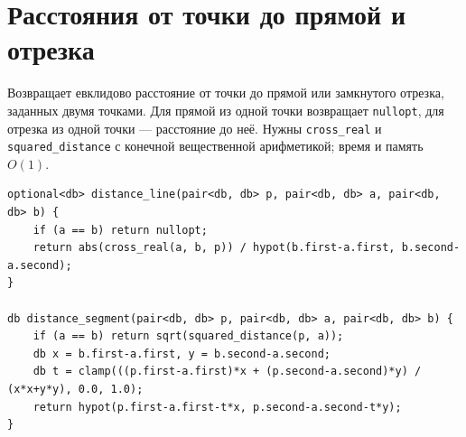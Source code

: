%

\section{Расстояния от точки до прямой и отрезка}
Возвращает евклидово расстояние от точки до прямой или замкнутого отрезка, заданных двумя точками.
Для прямой из одной точки возвращает \texttt{nullopt}, для отрезка из одной точки --- расстояние до неё.
Нужны \texttt{cross\_real} и \texttt{squared\_distance} с конечной вещественной арифметикой; время и память $O(1)$.
\begin{lstlisting}[name=geometry_distances]
optional<db> distance_line(pair<db, db> p, pair<db, db> a, pair<db, db> b) {
    if (a == b) return nullopt;
    return abs(cross_real(a, b, p)) / hypot(b.first-a.first, b.second-a.second);
}

db distance_segment(pair<db, db> p, pair<db, db> a, pair<db, db> b) {
    if (a == b) return sqrt(squared_distance(p, a));
    db x = b.first-a.first, y = b.second-a.second;
    db t = clamp(((p.first-a.first)*x + (p.second-a.second)*y) / (x*x+y*y), 0.0, 1.0);
    return hypot(p.first-a.first-t*x, p.second-a.second-t*y);
}
\end{lstlisting}
%

